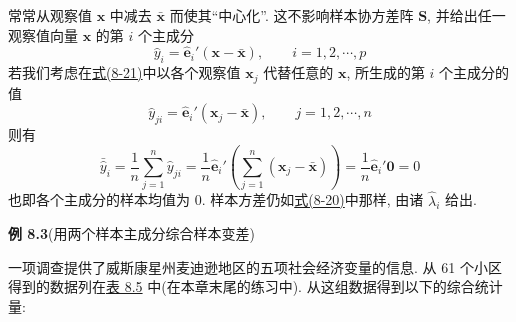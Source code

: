 常常从观察值 $\mathbf{x}$ 中减去 $\bar{\mathbf{x}}$ 而使其“中心化”. 这不影响样本协方差阵 $\mathbf{S}$, 并给出任一观察值向量 $\mathbf{x}$ 的第 $i$ 个主成分
\label{eq:8-21}
\begin{equation}
\hat{y}_i=\hat{\mathbf{e}}_i'(\mathbf{x}-\bar{\mathbf{x}}),\qquad i=1,2,\cdots,p
\tag{8-21}
\end{equation}
若我们考虑在\hyperref[eq:8-21]{式(8-21)}中以各个观察值 $\mathbf{x}_j$ 代替任意的 $\mathbf{x}$, 所生成的第 $i$ 个主成分的值
\label{eq:8-22}
\begin{equation}
\hat{y}_{ji}=\hat{\mathbf{e}}_i'(\mathbf{x}_j-\bar{\mathbf{x}}),\qquad j=1,2,\cdots,n
\tag{8-22}
\end{equation}
则有
\label{eq:8-23}
\begin{equation}
\bar{\hat{y}}_i=\frac{1}{n}\sum_{j=1}^{n}\hat{y}_{ji}=\frac{1}{n}\hat{\mathbf{e}}_i'\left(\sum_{j=1}^{n}(\mathbf{x}_j-\bar{\mathbf{x}})\right)=\frac{1}{n}\hat{\mathbf{e}}_i'\mathbf{0}=0
\tag{8-23}
\end{equation}
也即各个主成分的样本均值为 0. 样本方差仍如\hyperref[eq:8-20]{式(8-20)}中那样, 由诸 $\hat{\lambda}_i$ 给出.

\noindent\textbf{例 8.3}\quad (用两个样本主成分综合样本变差)

一项调查提供了威斯康星州麦迪逊地区的五项社会经济变量的信息. 从 61 个小区得到的数据列在\hyperref[tab:8.5]{表 8.5} 中(在本章末尾的练习中). 从这组数据得到以下的综合统计量:
